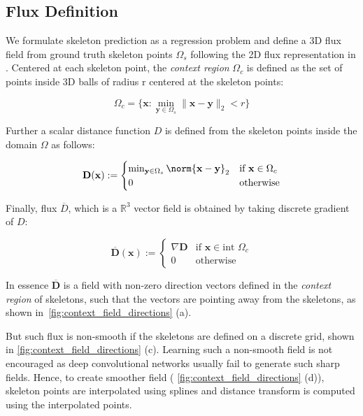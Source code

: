 \subsection{Flux Definition}
We formulate skeleton prediction as a regression problem and define a 3D flux field from ground truth skeleton points $\Omega_s$ following the 2D flux representation in \cite{Wang2019}. Centered at each skeleton point, the {\it context region} $\Omega_c$ is defined as the set of points inside 3D balls of radius r centered at the skeleton points:

\DeclarePairedDelimiter\norm\lVert\rVert

\begin{equation}
\Omega_c= \{ \mathbf{x} : \min_{\mathbf{y} \in \Omega_s} \|\mathbf{x} - \mathbf{y}\|_2 < r \}
\end{equation}

Further a scalar distance function $D$ is defined from the skeleton points inside the domain $\Omega$ as follows:

\begin{equation}
\mathbf{D}(\mathbf{x}) := \begin{cases}
		\min_{\mathbf{y} \in \Omega_s} \norm{\mathbf{x}-\mathbf{y}}_2 & \text{if } \mathbf{x} \in \Omega_c \\
		0  & \text{otherwise}
		\end{cases} 
\end{equation}

Finally, flux $\overline{D}$, which is a $\mathbb{R}^3$ vector field is obtained by taking discrete gradient of $D$:

\begin{equation}
 \overline{\mathbf{D}}(\mathbf{x}) := \begin{cases}
 \nabla \mathbf{D} & \text{if } \mathbf{x} \in \text{int } \Omega_c \\
 0  & \text{otherwise}
 \end{cases} 
\end{equation}
 
In essence $\overline{\mathbf{D}}$ is a field with non-zero direction vectors defined in the {\it context region} of skeletons, such that the vectors are pointing away from the skeletons, as shown in~\autoref{fig:context_field_directions} (a).
	
But such flux is non-smooth if the skeletons are defined on a discrete grid, shown in \autoref{fig:context_field_directions} (c). Learning such a non-smooth field is not encouraged as deep convolutional networks usually fail to generate such sharp fields. Hence, to create smoother field ( \autoref{fig:context_field_directions} (d)), skeleton points are interpolated using splines and distance transform is computed using the interpolated points.

